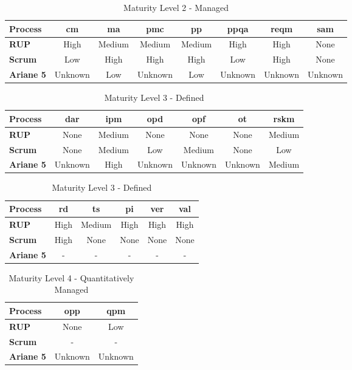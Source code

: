 \begin{table}[ht!]
    \centering
    \begin{tabular}{>{\bfseries}l|*{7}{c}}
        Process     & \acs{cm} & \acs{ma} & \acs{pmc} & \acs{pp} & \acs{ppqa} & \acs{reqm} & \acs{sam}  \\
        \toprule
        RUP         & High & Medium & Medium & Medium & High & High & None \\ 
        Scrum       & Low & High & High & High & Low & High & None \\ 
        Ariane 5    & Unknown & Low & Unknown & Low & Unknown & Unknown & Unknown \\ 
    \end{tabular}
    \caption{Maturity Level 2 - Managed}
    \label{tab:cmmi_l2}
\end{table}


\begin{table}[ht!]
    \centering
    \begin{tabular}{>{\bfseries}l|*{6}{c}}
        Process & \acs{dar} & \acs{ipm} & \acs{opd} & \acs{opf} & \acs{ot} & \acs{rskm} \\
        \toprule
        RUP     & None & Medium & None & None & None & Medium \\
        Scrum   & None & Medium & Low & Medium & None & Low \\ 
        Ariane 5 & Unknown & High & Unknown & Unknown & Unknown & Medium \\
    \end{tabular}
    \vspace{\baselineskip}\linebreak
    \begin{tabular}{>{\bfseries}l|*{5}{c}}
         Process & \acs{rd} & \acs{ts} & \acs{pi} & \acs{ver} & \acs{val} \\
         \toprule
         RUP & High & Medium & High & High & High \\ 
         Scrum & High & None & None & None & None \\ 
         Ariane 5 & - & - & - & - & - \\ 
    \end{tabular}
    \caption{Maturity Level 3 - Defined}
    \label{tab:cmmi_l3}
\end{table}

\begin{table}[ht!]
    \centering
    \begin{tabular}{>{\bfseries}l|cc}
        Process & \acs{opp} & \acs{qpm} \\
        \toprule
        RUP     & None & Low \\   
        Scrum   & - & - \\
        Ariane 5 & Unknown & Unknown \\
    \end{tabular}
    \caption{Maturity Level 4 - Quantitatively Managed}
    \label{tab:cmmi_l4}
\end{table}

